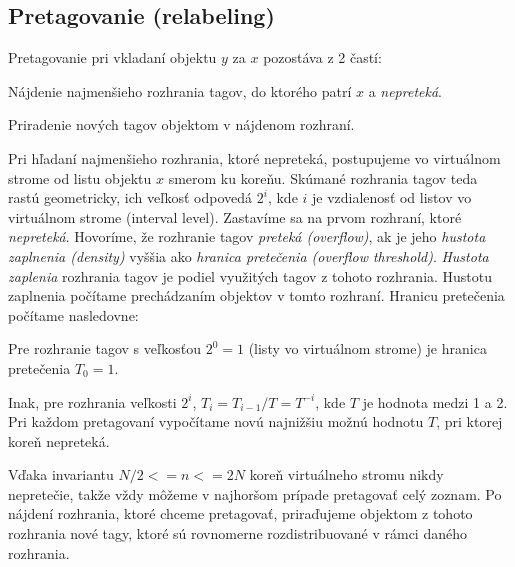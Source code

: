 \documentclass[
  digital,     %
  oneside,     %
  nosansbold,  %
  nocolorbold, %
  lof,         %
  lot,         %
]{fithesis4}
\begin{document}
\subsection{Pretagovanie (relabeling)}
Pretagovanie pri vkladaní objektu $y$ za $x$ pozostáva z 2 častí:
\begin{compactenum}
    \item Nájdenie najmenšieho rozhrania tagov, do ktorého patrí $x$ a \textit{nepreteká}.
    \item Priradenie nových tagov objektom v nájdenom rozhraní.
\end{compactenum}
Pri hľadaní najmenšieho rozhrania, ktoré nepreteká, postupujeme vo virtuálnom strome od listu objektu $x$ smerom ku koreňu. Skúmané rozhrania tagov teda rastú geometricky, ich veľkosť odpovedá $2^i$, kde $i$ je vzdialenosť od listov vo virtuálnom strome (interval level). Zastavíme sa na prvom rozhraní, ktoré \textit{nepreteká}.
Hovoríme, že rozhranie tagov \textit{preteká (overflow)}, ak je jeho \textit{hustota zaplnenia (density)} vyššia ako \textit{hranica pretečenia (overflow threshold)}. \textit{Hustota zaplenia} rozhrania tagov je podiel využitých tagov z tohoto rozhrania. Hustotu zaplnenia počítame prechádzaním objektov v tomto rozhraní. Hranicu pretečenia počítame nasledovne:
\begin{compactenum}
    \item Pre rozhranie tagov s veľkosťou $2^0 = 1$ (listy vo virtuálnom strome) je hranica pretečenia $T_0 = 1$.
    \item Inak, pre rozhrania veľkosti $2^i$, $T_i = T_{i-1} / T = T^{-i}$, kde $T$ je hodnota medzi 1 a 2. Pri každom pretagovaní vypočítame novú najnižšiu možnú hodnotu $T$, pri ktorej koreň nepreteká.
\end{compactenum}
Vďaka invariantu $N/2 <= n <= 2N$ koreň virtuálneho stromu nikdy nepretečie, takže vždy môžeme v najhoršom prípade pretagovať celý zoznam.
Po nájdení rozhrania, ktoré chceme pretagovať, priraďujeme objektom z tohoto rozhrania nové tagy, ktoré sú rovnomerne rozdistribuované v rámci daného rozhrania.
\end{document}
